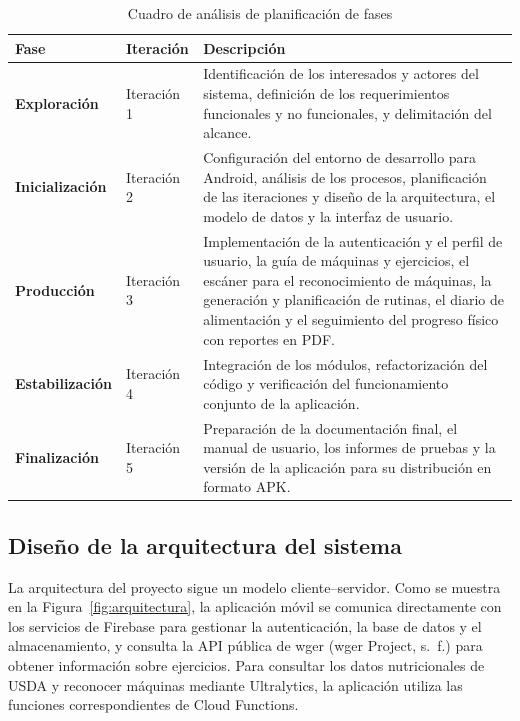 \begin{table}[H]
\centering
\small
\renewcommand{\arraystretch}{1.2}


\begin{tabularx}{\textwidth}{|L{2.8cm}|C{2.2cm}|Y|}
\hline
{}
\textbf{Fase} & \textbf{Iteración} & \textbf{Descripción} \\
\hline

\textbf{Exploración} & Iteración 1 &
Identificación de los interesados y actores del sistema, definición de
los requerimientos funcionales y no funcionales, y delimitación del alcance. \\
\hline

\textbf{Inicialización} & Iteración 2 &
Configuración del entorno de desarrollo para Android, análisis de los
procesos, planificación de las iteraciones y diseño de la arquitectura,
el modelo de datos y la interfaz de usuario. \\
\hline

\textbf{Producción} & Iteración 3 &
Implementación de la autenticación y el perfil de usuario, la guía de
máquinas y ejercicios, el escáner para el reconocimiento de máquinas,
la generación y planificación de rutinas, el diario de alimentación
y el seguimiento del progreso físico con reportes en PDF. \\
\hline

\textbf{Estabilización} & Iteración 4 &
Integración de los módulos, refactorización del código y verificación
del funcionamiento conjunto de la aplicación. \\
\hline

\textbf{Finalización} & Iteración 5 &
Preparación de la documentación final, el manual de usuario, los
informes de pruebas y la versión de la aplicación para su distribución
en formato APK. \\
\hline

\end{tabularx}
\caption{Cuadro de análisis de planificación de fases}
\label{tab:plan-iteraciones}
\end{table}

\subsection{Diseño de la arquitectura del sistema}
\label{sec:des-arquitectura}

La arquitectura del proyecto sigue un modelo cliente--servidor. 
Como se muestra en la Figura~\ref{fig:arquitectura}, la aplicación móvil 
se comunica directamente con los servicios de Firebase para gestionar 
la autenticación, la base de datos y el almacenamiento, y consulta 
la API pública de wger (wger Project, s.~f.) para obtener información sobre ejercicios. 
Para consultar los datos nutricionales de USDA y reconocer máquinas 
mediante Ultralytics, la aplicación utiliza las funciones correspondientes 
de Cloud Functions.

